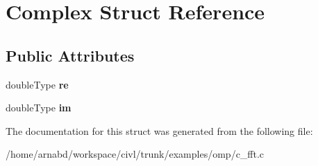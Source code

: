 \hypertarget{structComplex}{}\section{Complex Struct Reference}
\label{structComplex}
\subsection*{Public Attributes}
\begin{DoxyCompactItemize}
\item 
\hypertarget{structComplex_af2d2f7d5e06c520398243f9ec567bc09}{}double\+Type {\bfseries re}\label{structComplex_af2d2f7d5e06c520398243f9ec567bc09}

\item 
\hypertarget{structComplex_a6a5a63ec1d97c5aa95ce8e91043b4407}{}double\+Type {\bfseries im}\label{structComplex_a6a5a63ec1d97c5aa95ce8e91043b4407}

\end{DoxyCompactItemize}


The documentation for this struct was generated from the following file\+:\begin{DoxyCompactItemize}
\item 
/home/arnabd/workspace/civl/trunk/examples/omp/c\+\_\+fft.\+c\end{DoxyCompactItemize}
